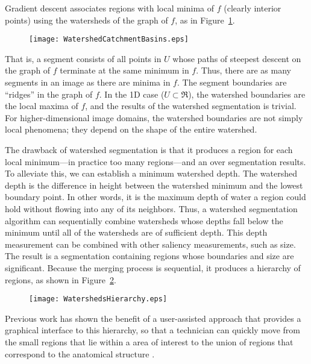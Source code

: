 Gradient descent associates regions with local minima of $f$ (clearly interior
points) using the watersheds of the graph of $f$, as in
Figure~\ref{fig:segment}.
\begin{figure}
\centering
\texttt{[image: WatershedCatchmentBasins.eps]}
\protect\label{fig:segment}
\end{figure}
That is, a segment consists of all points in $U$ whose paths of steepest
descent on the graph of $f$ terminate at the same minimum in $f$.  Thus, there
are as many segments in an image as there are minima in $f$.  The segment
boundaries are ``ridges'' \cite{Koenderink1979,Koenderink1993,Eberly1996} in
the graph of $f$.  In the 1D case ($U \subset \Re$), the watershed boundaries
are the local maxima of $f$, and the results of the watershed segmentation is
trivial.  For higher-dimensional image domains, the watershed boundaries are
not simply local phenomena; they depend on the shape of the entire watershed.

The drawback of watershed segmentation is that it produces a region for each
local minimum---in practice too many regions---and an over segmentation
results.  To alleviate this, we can establish a minimum watershed depth.  The
watershed depth is the difference in height between the watershed minimum and
the lowest boundary point.  In other words, it is the maximum depth of water
a region could hold without flowing into any of its neighbors.  Thus, a
watershed segmentation algorithm can sequentially combine watersheds whose
depths fall below the minimum until all of the watersheds are of sufficient
depth.  This depth measurement can be combined with other saliency
measurements, such as size.  The result is a segmentation containing regions
whose boundaries and size are significant.  Because the merging process is
sequential, it produces a hierarchy of regions, as shown in
Figure~\ref{fig:watersheds}.
\begin{figure}
\centering
\texttt{[image: WatershedsHierarchy.eps]}
\protect\label{fig:watersheds}
\end{figure}
Previous work has shown the benefit of a user-assisted approach that provides
a graphical interface to this hierarchy, so that a technician can quickly move
from the small regions that lie within a area of interest to the union of
regions that correspond to the anatomical structure \cite{Yoo1991}.

